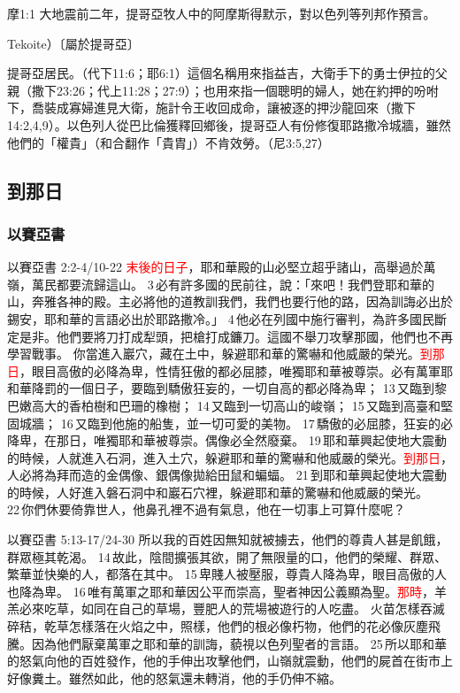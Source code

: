 摩1:1 大地震前二年，提哥亞牧人中的阿摩斯得默示，對以色列等列邦作預言。

Tekoite）〔屬於提哥亞〕

提哥亞居民。（代下11:6；耶6:1）這個名稱用來指益吉，大衛手下的勇士伊拉的父親（撒下23:26；代上11:28；27:9）；也用來指一個聰明的婦人，她在約押的吩咐下，喬裝成寡婦進見大衛，施計令王收回成命，讓被逐的押沙龍回來（撒下14:2,4,9）。以色列人從巴比倫獲釋回鄉後，提哥亞人有份修復耶路撒冷城牆，雖然他們的「權貴」（和合翻作「貴胄」）不肯效勞。（尼3:5,27）

\subsection{到那日}
\subsubsection{以賽亞書}
以賽亞書 2:2-4/10-22
\textcolor{red}{末後的日子}，耶和華殿的山必堅立超乎諸山，高舉過於萬嶺，萬民都要流歸這山。 3 必有許多國的民前往，說：「來吧！我們登耶和華的山，奔雅各神的殿。主必將他的道教訓我們，我們也要行他的路，因為訓誨必出於錫安，耶和華的言語必出於耶路撒冷。」 4 他必在列國中施行審判，為許多國民斷定是非。他們要將刀打成犁頭，把槍打成鐮刀。這國不舉刀攻擊那國，他們也不再學習戰事。
你當進入巖穴，藏在土中，躲避耶和華的驚嚇和他威嚴的榮光。\textcolor{red}{到那日}，眼目高傲的必降為卑，性情狂傲的都必屈膝，唯獨耶和華被尊崇。必有萬軍耶和華降罰的一個日子，要臨到驕傲狂妄的，一切自高的都必降為卑； 13 又臨到黎巴嫩高大的香柏樹和巴珊的橡樹； 14 又臨到一切高山的峻嶺； 15 又臨到高臺和堅固城牆； 16 又臨到他施的船隻，並一切可愛的美物。 17 驕傲的必屈膝，狂妄的必降卑，在那日，唯獨耶和華被尊崇。偶像必全然廢棄。 19 耶和華興起使地大震動的時候，人就進入石洞，進入土穴，躲避耶和華的驚嚇和他威嚴的榮光。\textcolor{red}{到那日}，人必將為拜而造的金偶像、銀偶像拋給田鼠和蝙蝠。 21 到耶和華興起使地大震動的時候，人好進入磐石洞中和巖石穴裡，躲避耶和華的驚嚇和他威嚴的榮光。 22 你們休要倚靠世人，他鼻孔裡不過有氣息，他在一切事上可算什麼呢？

以賽亞書 5:13-17/24-30
所以我的百姓因無知就被擄去，他們的尊貴人甚是飢餓，群眾極其乾渴。 14 故此，陰間擴張其欲，開了無限量的口，他們的榮耀、群眾、繁華並快樂的人，都落在其中。 15 卑賤人被壓服，尊貴人降為卑，眼目高傲的人也降為卑。 16 唯有萬軍之耶和華因公平而崇高，聖者神因公義顯為聖。\textcolor{red}{那時}，羊羔必來吃草，如同在自己的草場，豐肥人的荒場被遊行的人吃盡。
火苗怎樣吞滅碎秸，乾草怎樣落在火焰之中，照樣，他們的根必像朽物，他們的花必像灰塵飛騰。因為他們厭棄萬軍之耶和華的訓誨，藐視以色列聖者的言語。 25 所以耶和華的怒氣向他的百姓發作，他的手伸出攻擊他們，山嶺就震動，他們的屍首在街市上好像糞土。雖然如此，他的怒氣還未轉消，他的手仍伸不縮。

